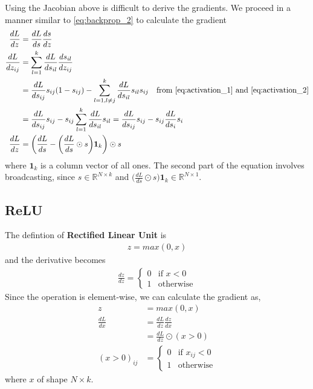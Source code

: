 \documentclass[../../deep_learning_notes.tex]{subfiles}
\begin{document}
Using the Jacobian above is difficult to derive the gradients. We proceed in a manner similar to \eqref{eq:backprop_2} to calculate the gradient
\begin{align*}
    \frac{dL}{dz} &= \frac{dL}{ds} \frac{ds}{dz}\\
    \frac{dL}{dz_{ij}} &= \sum_{l=1}^{k} \frac{dL}{ds_{il}} \frac{ds_{il}}{dz_{ij}}\\
    &= \frac{dL}{ds_{ij}}s_{ij}(1-s_{ij}) - \sum_{l=1, l\neq j}^{k} \frac{dL}{ds_{il}}s_{il}s_{ij} \quad \text{from \eqref{eq:activation_1} and \eqref{eq:activation_2}}\\
    &= \frac{dL}{ds_{ij}}s_{ij} - s_{ij}\sum_{l=1}^{k}\frac{dL}{ds_{il}}s_{il}
    = \frac{dL}{ds_{ij}}s_{ij} - s_{ij}\frac{dL}{ds_{i}}s_{i}\\
    \frac{dL}{dz} &= \bigg( \frac{dL}{ds} - \bigg(\frac{dL}{ds} \odot s \bigg)\bm{1}_{k} \bigg) \odot s
\end{align*}
where $\bm{1}_{k}$ is a column vector of all ones. The second part of the equation involves broadcasting, since $s \in \mathbb{R}^{N \times k}$ and $\bigg(\frac{dL}{ds} \odot s \bigg)\bm{1}_{k} \in \mathbb{R}^{N \times 1}$.

\subsection{ReLU}
The defintion of \textbf{Rectified Linear Unit} is 
\begin{align*}
    z = max(0, x)
\end{align*}
and the derivative becomes
\begin{align*}
    \frac{dz}{dz} = \begin{cases}
        0 &\mbox{if $x < 0$}\\
        1 &\mbox{otherwise}
    \end{cases}
\end{align*}
Since the operation is element-wise, we can calculate the gradient as,
\begin{align*}
    z &= max(0, x)\\
    \frac{dL}{dx} &= \frac{dL}{dz} \frac{dz}{dx}\\
    &= \frac{dL}{dz} \odot (x > 0)\\
    (x > 0)_{ij} &= \begin{cases}
        0 &\mbox{if $x_{ij} < 0$}\\
        1 &\mbox{otherwise}
    \end{cases}
\end{align*}
where $x$ of shape $N \times k$.
\end{document}
